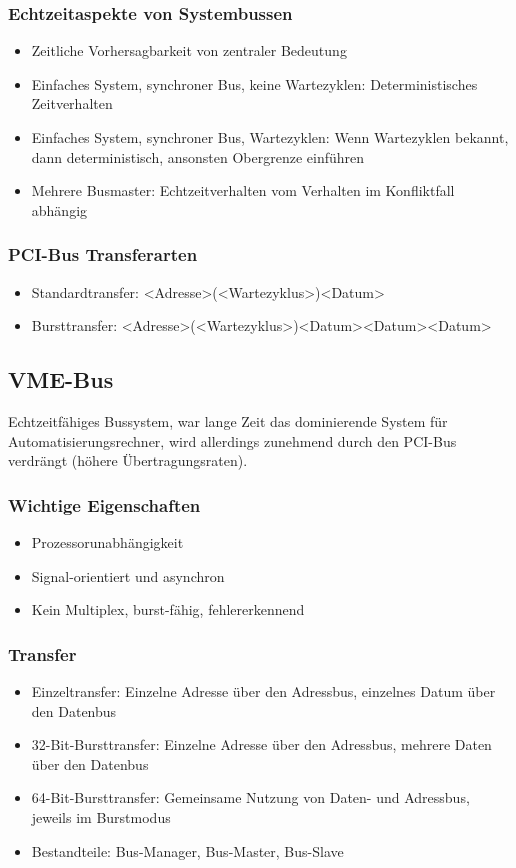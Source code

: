 \subsubsection{Echtzeitaspekte von Systembussen}
\begin{itemize}
	\item Zeitliche Vorhersagbarkeit von zentraler Bedeutung
	\item Einfaches System, synchroner Bus, keine Wartezyklen: Deterministisches Zeitverhalten
	\item Einfaches System, synchroner Bus, Wartezyklen: Wenn Wartezyklen bekannt, dann deterministisch, ansonsten Obergrenze einführen
	\item Mehrere Busmaster: Echtzeitverhalten vom Verhalten im Konfliktfall abhängig
\end{itemize}

\subsubsection{PCI-Bus Transferarten}
\begin{itemize}
	\item Standardtransfer: <Adresse>(<Wartezyklus>)<Datum>
	\item Bursttransfer: <Adresse>(<Wartezyklus>)<Datum><Datum><Datum>
\end{itemize}


\subsection{VME-Bus}

Echtzeitfähiges Bussystem, war lange Zeit das dominierende System für Automatisierungsrechner, wird allerdings zunehmend durch den PCI-Bus verdrängt (höhere Übertragungsraten).

\subsubsection{Wichtige Eigenschaften}
\begin{itemize}
	\item Prozessorunabhängigkeit
	\item Signal-orientiert und asynchron
	\item Kein Multiplex, burst-fähig, fehlererkennend
\end{itemize}

\subsubsection{Transfer}
\begin{itemize}
	\item Einzeltransfer: Einzelne Adresse über den Adressbus, einzelnes Datum über den Datenbus
	\item 32-Bit-Bursttransfer: Einzelne Adresse über den Adressbus, mehrere Daten über den Datenbus
	\item 64-Bit-Bursttransfer: Gemeinsame Nutzung von Daten- und Adressbus, jeweils im Burstmodus
	\item Bestandteile: Bus-Manager, Bus-Master, Bus-Slave
\end{itemize}


